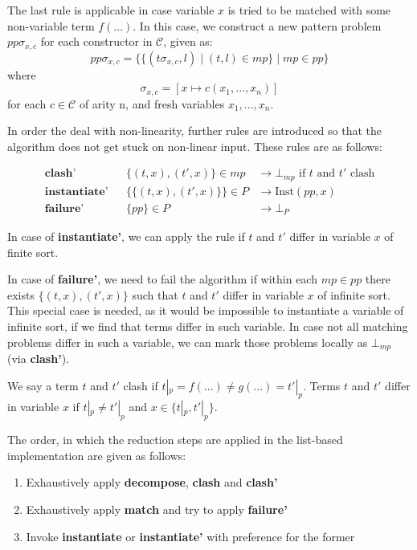 The last rule is applicable in case variable $x$ is tried to be matched with some non-variable term $f(...)$. In this case, we construct a new pattern problem $pp\sigma_{x,c}$ for each constructor in $\mathcal{C}$, given as:
$$pp\sigma_{x,c} = \{\{ (t\sigma_{x,c},l) \mid (t,l) \in mp\} \mid mp \in pp\}$$
where
$$\sigma_{x,c} = [x \mapsto c(x_1, ..., x_n)]$$ for each $c \in \mathcal{C}$ of arity n, and fresh variables $x_1, ..., x_n$.

In order the deal with non-linearity, further rules are introduced so that the algorithm does not get stuck on non-linear input. These rules are as follows:

\begin{align*}
\textbf{clash'} & & \{(t,x), (t',x)\} \in mp &\rightarrow \bot_{mp}\text{ if $t$ and $t'$ clash} \\
\textbf{instantiate'} & & \{\{(t,x), (t',x)\}\} \in P &\rightarrow \text{Inst$(pp,x)$} \\
\textbf{failure'} & & \{pp\} \in P &\rightarrow \bot_P
\end{align*}

In case of \textbf{instantiate'}, we can apply the rule if $t$ and $t'$ differ in variable $x$ of finite sort.

In case of \textbf{failure'}, we need to fail the algorithm if within each $mp \in pp$ there exists $\{(t,x),(t',x)\}$ such that $t$ and $t'$ differ in variable $x$ of infinite sort. This special case is needed, as it would be impossible to instantiate a variable of infinite sort, if we find that terms differ in such variable. In case not all matching problems differ in such a variable, we can mark those problems locally as $\bot_{mp}$ (via \textbf{clash'}).

We say a term $t$ and $t'$ clash if $t|_p=f(...) \neq g(...)=t'|_p$. Terms $t$ and $t'$ differ in variable $x$ if $t|_p \neq t'|_p$ and $x \in \{t|_p, t'|_p\}$.

The order, in which the reduction steps are applied in the list-based implementation are given as follows:
\begin{enumerate}
    \item Exhaustively apply \textbf{decompose}, \textbf{clash} and \textbf{clash'}
    \item Exhaustively apply \textbf{match} and try to apply \textbf{failure'}
    \item Invoke \textbf{instantiate} or \textbf{instantiate'} with preference for the former
\end{enumerate}


